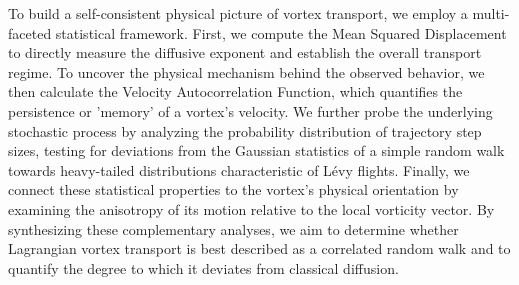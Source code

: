 \documentclass[]{article}
\begin{document}
To build a self-consistent physical picture of vortex transport, we employ a multi-faceted statistical framework. First, we compute the Mean Squared Displacement to directly measure the diffusive exponent and establish the overall transport regime. To uncover the physical mechanism behind the observed behavior, we then calculate the Velocity Autocorrelation Function, which quantifies the persistence or 'memory' of a vortex's velocity. We further probe the underlying stochastic process by analyzing the probability distribution of trajectory step sizes, testing for deviations from the Gaussian statistics of a simple random walk towards heavy-tailed distributions characteristic of Lévy flights. Finally, we connect these statistical properties to the vortex's physical orientation by examining the anisotropy of its motion relative to the local vorticity vector. By synthesizing these complementary analyses, we aim to determine whether Lagrangian vortex transport is best described as a correlated random walk and to quantify the degree to which it deviates from classical diffusion.
\end{document}
